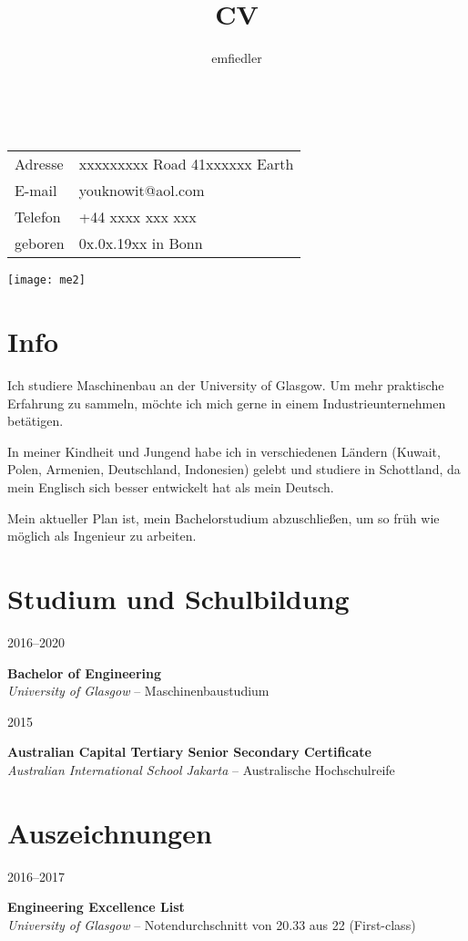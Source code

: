 \documentclass[a4paper]{article}
\title{CV}
\author{emfiedler}
\makeatletter
\renewcommand{\maketitle}{
\begin{flushleft}
{\Huge
\theauthor}\\
\vspace{3mm}
\hspace{3mm} 
\begingroup
\renewcommand{\arraystretch}{1.2}
\begin{tabular}{@{} p{15mm} p{50mm}}
	Adresse	&xxxxxxxxx Road 41\newline xxxxxx Earth\\
	E-mail 	&youknowit@aol.com\\
	Telefon	&+44 xxxx xxx xxx\\
	geboren	&0x.0x.19xx in Bonn
\end{tabular}
\endgroup

\end{flushleft}
}
\newcommand{\entry}[4]{

	\begin{minipage}[t]{.20\textwidth}
		\hfill \textsc{#1}

	\end{minipage}
	\hfill\vline\hfill
	\begin{minipage}[t]{.75\textwidth}
		\textbf{#2}\\ 
		\textit{#3}    
		#4

	\end{minipage} 
	\vspace{.25cm}

}
\makeatother
\begin{document}

\begin{minipage}{0.73\textwidth}
\maketitle
\end{minipage}
\begin{minipage}{0.25\textwidth}
	\hspace{2mm} 
	\vspace{-2mm} 
	\texttt{[image: me2]}
\end{minipage}

\section{Info}
Ich studiere Maschinenbau an der University of Glasgow. Um mehr praktische Erfahrung zu sammeln, m{\"o}chte ich mich gerne in einem Industrieunternehmen bet{\"a}tigen.

\vspace{.25cm}

In meiner Kindheit und Jungend habe ich in verschiedenen L{\"a}ndern (Kuwait, Polen, Armenien, Deutschland, Indonesien) gelebt und studiere in Schottland, da mein Englisch sich besser entwickelt hat als mein Deutsch.

\vspace{.25cm}

Mein aktueller Plan ist, mein Bachelorstudium abzuschlie{\ss}en, um so fr{\"u}h wie m{\"o}glich als Ingenieur zu arbeiten.


\section{Studium und Schulbildung}

\entry{2016--2020}{Bachelor of Engineering}{University of Glasgow}{-- Maschinenbaustudium}

\entry{2015}{Australian Capital Tertiary Senior Secondary Certificate}{Australian International School Jakarta}{-- Australische Hochschulreife}


\section{Auszeichnungen}

\entry{2016--2017}{Engineering Excellence List}{University of Glasgow}{-- Notendurchschnitt von 20.33 aus 22 (First-class)}
\end{document}
